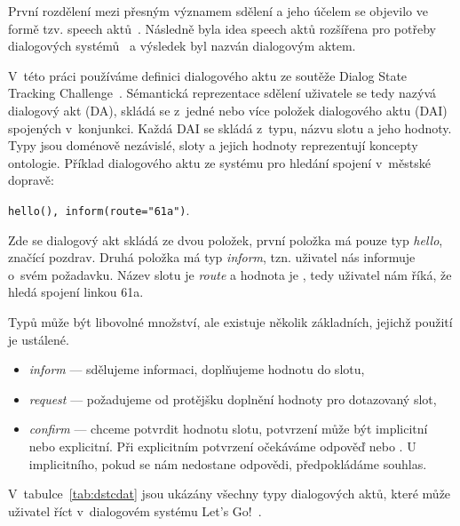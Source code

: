 První rozdělení mezi přesným významem sdělení a jeho účelem se objevilo ve formě tzv. speech aktů~\cite{austin1975things}.
Následně byla idea speech aktů rozšířena pro potřeby dialogových systémů~\cite{traum1999speech} a výsledek byl nazván dialogovým aktem.

V~této práci používáme definici dialogového aktu ze soutěže Dialog State Tracking Challenge~\cite{williamsdialog}.
Sémantická reprezentace sdělení uživatele se tedy nazývá dialogový akt (DA), skládá se z~jedné nebo více položek dialogového aktu (DAI) spojených v~konjunkci.
Každá DAI se skládá z~typu, názvu slotu a jeho hodnoty. 
Typy jsou doménově nezávislé, sloty a jejich hodnoty reprezentují koncepty ontologie.
Příklad dialogového aktu ze systému pro hledání spojení v~městské dopravě:

\begin{center}
{\tt hello(), inform(route="61a")}.
\end{center}

Zde se dialogový akt skládá ze dvou položek, první položka má pouze typ {\em hello}, značící pozdrav.
Druhá položka má typ {\em inform}, tzn. uživatel nás informuje o~svém požadavku.
Název slotu je {\em route} a hodnota je , tedy uživatel nám říká, že hledá spojení linkou 61a.

Typů může být libovolné množství, ale existuje několik základních, jejichž použití je ustálené.
\begin{itemize}
\item {\em inform} --- sdělujeme informaci, doplňujeme hodnotu do slotu,
\item {\em request} --- požadujeme od protějšku doplnění hodnoty pro dotazovaný slot,
\item {\em confirm} --- chceme potvrdit hodnotu slotu, potvrzení může být implicitní nebo explicitní.
	Při explicitním potvrzení očekáváme odpověď  nebo .
	U implicitního, pokud se nám nedostane odpovědi, předpokládáme souhlas.
\end{itemize}

V~tabulce~\ref{tab:dstcdat} jsou ukázány všechny typy dialogových aktů, které může uživatel říct v~dialogovém systému Let's Go!~\cite{williamsdialog}.

